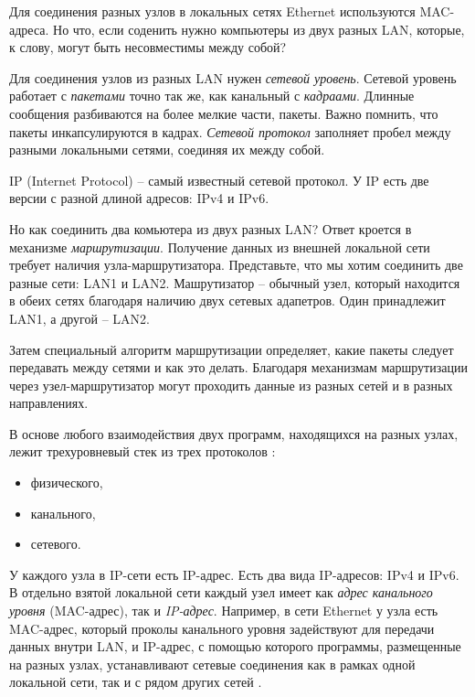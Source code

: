 \documentclass[%
	11pt,
	a4paper,
	utf8,
		]{article}
\begin{document}
Для соединения разных узлов в локальных сетях Ethernet используются MAC-адреса. Но что, если соденить нужно компьютеры из двух разных LAN, которые, к слову, могут быть несовместимы между собой?

Для соединения узлов из разных LAN нужен \emph{сетевой уровень}. Сетевой уровень работает с \emph{пакетами} точно так же, как канальный с \emph{кадраами}. Длинные сообщения разбиваются на более мелкие части, пакеты. Важно помнить, что пакеты инкапсулируются в кадрах. \emph{Сетевой протокол} заполняет пробел между разными локальными сетями, соединяя их между собой.

IP (Internet Protocol) -- самый известный сетевой протокол. У IP есть две версии с разной длиной адресов: IPv4 и IPv6.

Но как соединить два комьютера из двух разных LAN? Ответ кроется в механизме \emph{маршрутизации}. Получение данных из внешней локальной сети требует наличия узла-маршрутизатора. Представьте, что мы хотим соединить две разные сети: LAN1 и LAN2. Машрутизатор -- обычный узел, который находится в обеих сетях благодаря наличию двух сетевых адапетров. Один принадлежит LAN1, а другой -- LAN2.

Затем специальный алгоритм маршрутизации определяет, какие пакеты следует передавать между сетями и как это делать. Благодаря механизмам маршрутизации через узел-маршрутизатор могут проходить данные из разных сетей и в разных направлениях.

В основе любого взаимодействия двух программ, находящихся на разных узлах, лежит трехуровневый стек из трех протоколов \cite[]{amini-extreme-c:2022}:
\begin{itemize}
	\item физического,
	
	\item канального,
	
	\item сетевого.
\end{itemize}

У каждого узла в IP-сети есть IP-адрес. Есть два вида IP-адресов: IPv4 и IPv6. В отдельно взятой локальной сети каждый узел имеет как \emph{адрес канального уровня} (MAC-адрес), так и \emph{IP-адрес}. Например, в сети Ethernet у узла есть MAC-адрес, который проколы канального уровня задействуют для передачи данных внутри LAN, и IP-адрес, с помощью которого программы, размещенные на разных узлах, устанавливают сетевые соединения как в рамках одной локальной сети, так и с рядом других сетей \cite[]{amini-extreme-c:2022}.
\end{document}
